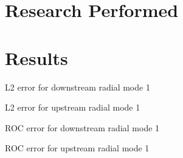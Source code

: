 \documentclass[a4paper]{report}
\begin{document}
\section{Research Performed}
\section{Results}

\begin{table}
    \makebox[\linewidth]{
        
    }
    \caption{L2 error for downstream radial mode 1}
\end{table}
\begin{table}
    \makebox[\linewidth]{
        
    }
    \caption{L2 error for upstream radial mode 1}
\end{table}

\begin{table}
    \makebox[\linewidth]{
        
    }
    \caption{ROC error for downstream radial mode 1}
\end{table}
\begin{table}
    \makebox[\linewidth]{
        
    }
    \caption{ROC error for upstream radial mode 1}
\end{table}

\end{document}
